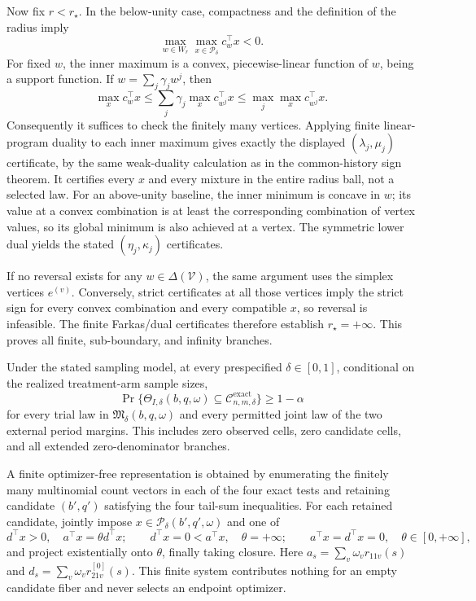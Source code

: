 Now fix \(r<r_\star\).  In the below-unity case, compactness and the definition of the radius imply
\[
\max_{w\in W_r}\max_{x\in\mathcal P_\delta}c_w^\top x<0.
\]
For fixed \(w\), the inner maximum is a convex, piecewise-linear function of \(w\), being a support function.  If \(w=\sum_j\gamma_jw^j\), then
\[
\max_xc_w^\top x
\leq\sum_j\gamma_j\max_xc_{w^j}^\top x
\leq\max_j\max_xc_{w^j}^\top x.
\]
Consequently it suffices to check the finitely many vertices.  Applying finite linear-program duality to each inner maximum gives exactly the displayed \((\lambda_j,\mu_j)\) certificate, by the same weak-duality calculation as in the common-history sign theorem.  It certifies every \(x\) and every mixture in the entire radius ball, not a selected law.  For an above-unity baseline, the inner minimum is concave in \(w\); its value at a convex combination is at least the corresponding combination of vertex values, so its global minimum is also achieved at a vertex.  The symmetric lower dual yields the stated \((\eta_j,\kappa_j)\) certificates.

If no reversal exists for any \(w\in\Delta(\mathcal V)\), the same argument uses the simplex vertices \(e^{(v)}\).  Conversely, strict certificates at all those vertices imply the strict sign for every convex combination and every compatible \(x\), so reversal is infeasible.  The finite Farkas/dual certificates therefore establish \(r_\star=+\infty\).  This proves all finite, sub-boundary, and infinity branches.

Under the stated sampling model, at every prespecified \(\delta\in[0,1]\), conditional on the realized treatment-arm sample sizes,
\[
\Pr\{\Theta_{I,\delta}(b,q,\omega)\subseteq
\mathcal C_{n,m,\delta}^{\mathrm{exact}}\}\geq1-\alpha
\]
for every trial law in \(\mathfrak M_\delta(b,q,\omega)\) and every permitted joint law of the two external period margins.  This includes zero observed cells, zero candidate cells, and all extended zero-denominator branches.

A finite optimizer-free representation is obtained by enumerating the finitely many multinomial count vectors in each of the four exact tests and retaining candidate \((b',q')\) satisfying the four tail-sum inequalities.  For each retained candidate, jointly impose \(x\in\mathcal P_\delta(b',q',\omega)\) and one of
\[
d^\top x>0,\quad a^\top x=\theta d^\top x;
\qquad d^\top x=0<a^\top x,\quad\theta=+\infty;
\qquad a^\top x=d^\top x=0,\quad\theta\in[0,+\infty],
\]
and project existentially onto \(\theta\), finally taking closure.  Here \(a_s=\sum_v\omega_vr_{11v}(s)\) and \(d_s=\sum_v\omega_vr^{[0]}_{21v}(s)\).  This finite system contributes nothing for an empty candidate fiber and never selects an endpoint optimizer.

